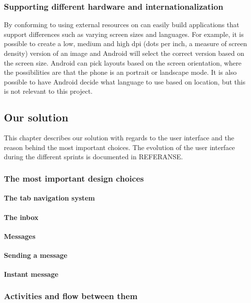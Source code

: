 \subsubsection{Supporting different hardware and internationalization}
By conforming to using external resources on can easily build applications that support differences such as varying screen sizes and languages. For example, it is possible to create a low, medium and high dpi (dots per inch, a measure of screen density) version of an image and Android will select the correct version based on the screen size. Android can pick layouts based on the screen orientation, where the possibilities are that the phone is an portrait or landscape mode. It is also possible to have Android decide what language to use based on location, but this is not relevant to this project. 

\subsection{Our solution}

This chapter describes our solution with regards to the user interface and the reason behind the most important choices. The evolution of the user interface during the different sprints is documented in REFERANSE.

\subsubsection{The most important design choices}

\paragraph{The tab navigation system}
\paragraph{The inbox}
\paragraph{Messages}
\paragraph{Sending a message}
\paragraph{Instant message}

\subsubsection{Activities and flow between them}

